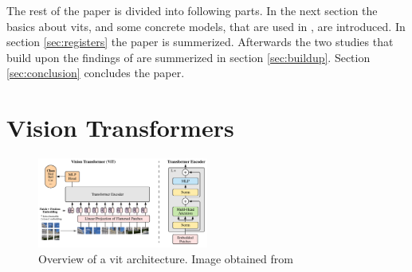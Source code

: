 \documentclass[conference]{IEEEtran}
\begin{document}
  The rest of the paper is divided into following parts. In the next section the basics about \acp{vit}, and some concrete models, that are used in \cite{registers}, are introduced. In section \ref{sec:registers} the paper \cite{registers} is summerized. Afterwards the two studies \cite{mamba-needs-registers} \cite{denoising} that build upon the findings of \cite{registers} are summerized in section \ref{sec:buildup}. Section \ref{sec:conclusion} concludes the paper.

  \section{Vision Transformers}
  \label{sec:vits}

  \begin{figure}
    \centering
    \includegraphics[width=0.5\textwidth]{figures/vit-architecture.png}
    \caption{Overview of a \ac{vit} architecture. Image obtained from \cite{visiontransformers2021}}
    \label{fig:vit-architecture}
  \end{figure}
\end{document}
